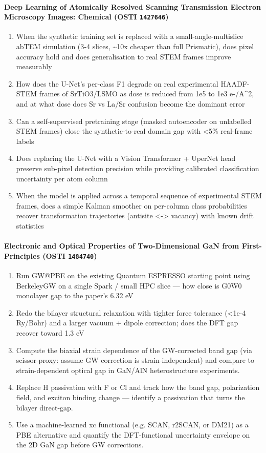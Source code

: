 \paragraph{Deep Learning of Atomically Resolved Scanning Transmission Electron Microscopy Images: Chemical \textnormal{\small(OSTI \texttt{1427646})}}
\begin{enumerate}[leftmargin=1.6em,itemsep=0.2em,topsep=0.2em,label=Q\arabic*.]
\item When the synthetic training set is replaced with a small-angle-multislice abTEM simulation (3-4 slices, \textasciitilde{}10x cheaper than full Prismatic), does pixel accuracy hold and does generalisation to real STEM frames improve measurably
\item How does the U-Net's per-class F1 degrade on real experimental HAADF-STEM frames of SrTiO3/LSMO as dose is reduced from 1e5 to 1e3 e-/A\textasciicircum{}2, and at what dose does Sr vs La/Sr confusion become the dominant error
\item Can a self-supervised pretraining stage (masked autoencoder on unlabelled STEM frames) close the synthetic-to-real domain gap with \textless{}5\% real-frame labels
\item Does replacing the U-Net with a Vision Transformer + UperNet head preserve sub-pixel detection precision while providing calibrated classification uncertainty per atom column
\item When the model is applied across a temporal sequence of experimental STEM frames, does a simple Kalman smoother on per-column class probabilities recover transformation trajectories (antisite \textless{}-\textgreater{} vacancy) with known drift statistics
\end{enumerate}
\paragraph{Electronic and Optical Properties of Two-Dimensional GaN from First-Principles \textnormal{\small(OSTI \texttt{1484740})}}
\begin{enumerate}[leftmargin=1.6em,itemsep=0.2em,topsep=0.2em,label=Q\arabic*.]
\item Run GW@PBE on the existing Quantum ESPRESSO starting point using BerkeleyGW on a single Spark / small HPC slice --- how close is G0W0 monolayer gap to the paper's 6.32 eV
\item Redo the bilayer structural relaxation with tighter force tolerance (\textless{}1e-4 Ry/Bohr) and a larger vacuum + dipole correction; does the DFT gap recover toward 1.3 eV
\item Compute the biaxial strain dependence of the GW-corrected band gap (via scissor-proxy: assume GW correction is strain-independent) and compare to strain-dependent optical gap in GaN/AlN heterostructure experiments.
\item Replace H passivation with F or Cl and track how the band gap, polarization field, and exciton binding change --- identify a passivation that turns the bilayer direct-gap.
\item Use a machine-learned xc functional (e.g. SCAN, r2SCAN, or DM21) as a PBE alternative and quantify the DFT-functional uncertainty envelope on the 2D GaN gap before GW corrections.
\end{enumerate}
